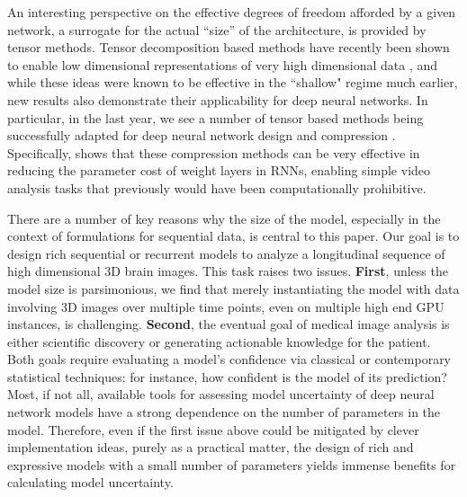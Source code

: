 An interesting perspective on the effective degrees of freedom afforded 
by a given network, a surrogate for the actual ``size'' of the architecture, 
is provided by tensor methods.
Tensor decomposition based methods have recently been shown to enable low dimensional representations of very high dimensional data \cite{hwangCvpr18}, 
and while these ideas were known to be effective in the ``shallow" regime much earlier, new results also demonstrate their applicability for deep neural 
networks. 
In particular, in the last year, we see a number of tensor based methods being successfully adapted for deep neural network design and compression \cite{cohen2016expressive,zhang2017tucker,yu2017compressing,xiong2019antnets}.
Specifically, \cite{pmlr-v70-yang17e} shows that these compression methods can be very effective in reducing the parameter cost of weight layers in RNNs, enabling simple video analysis tasks that previously would have been computationally prohibitive.

There are a number of key reasons why the size of the model, especially in the context of formulations for sequential data, is central to this paper. Our goal is to design rich sequential or recurrent models to analyze a longitudinal sequence of high dimensional 3D brain images. 
This task raises two issues. {\bf First}, 
unless the model size is parsimonious, we find that merely instantiating the 
model with data involving 3D images over multiple time points, even on multiple high end GPU instances, is challenging.
{\bf Second}, 
the eventual goal of medical image analysis is either scientific discovery or generating 
actionable knowledge for the patient. 
Both goals require evaluating a model's confidence via 
classical or contemporary statistical techniques: for instance, how confident is the model of its prediction?  
Most, if not all, available tools for assessing 
model uncertainty of deep neural network models 
have a strong dependence on the number of parameters in 
the model. Therefore, even if the first issue above could be mitigated by clever implementation ideas, purely as a practical 
matter, the design of rich and expressive models with a small number of parameters yields immense benefits for calculating model uncertainty.

